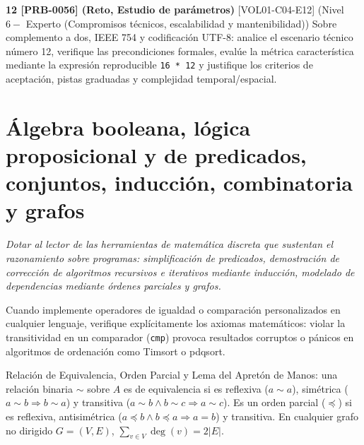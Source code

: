 \documentclass{book}
\begin{document}
\begin{tcolorbox}[title={Ejercicios}, studiumworked, breakable]
\noindent\textbf{12 [PRB-0056] (Reto, Estudio de parámetros)}
[VOL01-C04-E12] (Nivel \(6 -\) Experto (Compromisos técnicos, escalabilidad y mantenibilidad)) Sobre complemento a dos, IEEE 754 y codificación UTF-8: analice el escenario técnico número 12, verifique las precondiciones formales, evalúe la métrica característica mediante la expresión reproducible \texttt{16 * 12} y justifique los criterios de aceptación, pistas graduadas y complejidad temporal/espacial.
\end{tcolorbox}

\chapter{Álgebra booleana, lógica proposicional y de predicados, conjuntos, inducción, combinatoria y grafos}
\label{chap:cap05-logica-algebra-booleana-matematica-discreta}

\noindent\textit{Dotar al lector de las herramientas de matemática discreta que sustentan el razonamiento sobre programas: simplificación de predicados, demostración de corrección de algoritmos recursivos e iterativos mediante inducción, modelado de dependencias mediante órdenes parciales y grafos.}

\begin{tcolorbox}[title={Consejo}, studiumtip, breakable]

Cuando implemente operadores de igualdad o comparación personalizados en cualquier lenguaje, verifique explícitamente los axiomas matemáticos: violar la transitividad en un comparador (\texttt{cmp}) provoca resultados corruptos o pánicos en algoritmos de ordenación como Timsort o pdqsort.
\end{tcolorbox}

\begin{tcolorbox}[title={Definición}, studiumdef, breakable]

Relación de Equivalencia, Orden Parcial y Lema del Apretón de Manos: una relación binaria \(\sim\) sobre \(A\) es de equivalencia si es reflexiva (\(a \sim a\)), simétrica (\(a \sim b \Rightarrow b \sim a\)) y transitiva (\(a \sim b \land b \sim c \Rightarrow a \sim c\)). Es un orden parcial (\(\preceq\)) si es reflexiva, antisimétrica (\(a \preceq b \land b \preceq a \Rightarrow a = b\)) y transitiva. En cualquier grafo no dirigido \(G = (V, E)\), \(\sum_{v \in V} \deg(v) = 2|E|\).
\end{tcolorbox}
\end{document}
